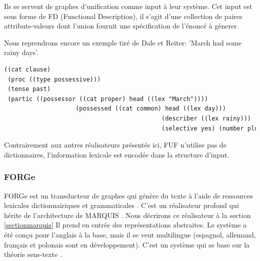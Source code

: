 
Ils se servent de graphes d'unification comme input à leur système. Cet input est sous forme de FD (Functional Description), il s'agit d'une collection de paires attributs-valeurs dont l'union fournit une spécification de l'énoncé à génerer.

Nous reprendrons encore un exemple tiré de Dale et Reiter: 'March had some rainy days'.
\begin{lstlisting}[language=Xml, caption=FD: input de Surge, label=surge]
((cat clause)
 (proc ((type possessive)))
 (tense past)
 (partic ((possessor ((cat proper) head ((lex "March"))))
					(possessed ((cat common) head ((lex day)))
											(describer ((lex rainy)))
											(selective yes) (number plural)))))
\end{lstlisting}

Contrairement aux autres réalisateurs présentés ici, FUF n'utilise pas de dictionnaires, l'information lexicale est encodée dans la structure d'input.

\subsubsection{FORGe}
FORGe est un transducteur de graphes qui génère du texte à l'aide de ressources lexicales dictionnairiques et grammaticales \citep{MilledemoFORGePompeu2017}. C'est un réalisateur profond qui hérite de l'architecture de MARQUIS \citep{WannerMARQUISGENERATIONUSERTAILORED2010}. Nous décrirons ce réalisateur à la section \ref{sectionmarquis}  Il prend en entrée des représentations abstraites. Le système a été conçu pour l'anglais à la base, mais il se veut multilingue (espagnol, allemand, français et polonais sont en développement). C'est un système qui se base sur la théorie sens-texte \citep{melcuk1988}.


